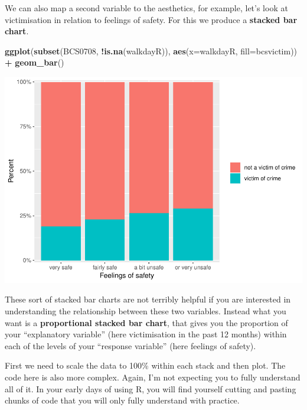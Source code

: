 \documentclass[]{book}
\newenvironment{Shaded}{\begin{snugshade}}{\end{snugshade}}
\newcommand{\DataTypeTok}[1]{\textcolor[rgb]{0.13,0.29,0.53}{#1}}
\newcommand{\KeywordTok}[1]{\textcolor[rgb]{0.13,0.29,0.53}{\textbf{#1}}}
\newcommand{\NormalTok}[1]{#1}
\newcommand{\OperatorTok}[1]{\textcolor[rgb]{0.81,0.36,0.00}{\textbf{#1}}}
\newcommand{\StringTok}[1]{\textcolor[rgb]{0.31,0.60,0.02}{#1}}
\theoremstyle{definition}
\theoremstyle{definition}
\theoremstyle{definition}
\theoremstyle{remark}
\begin{document}
We can also map a second variable to the aesthetics, for example, let's
look at victimisation in relation to feelings of safety. For this we
produce a \textbf{stacked bar chart}.

\begin{Shaded}
\begin{Highlighting}[]
\KeywordTok{ggplot}\NormalTok{(}\KeywordTok{subset}\NormalTok{(BCS0708, }\OperatorTok{!}\KeywordTok{is.na}\NormalTok{(walkdayR)), }\KeywordTok{aes}\NormalTok{(}\DataTypeTok{x=}\NormalTok{walkdayR, }\DataTypeTok{fill=}\NormalTok{bcsvictim)) }\OperatorTok{+}
\StringTok{  }\KeywordTok{geom_bar}\NormalTok{()}
\end{Highlighting}
\end{Shaded}

\includegraphics{03-visualisation_files/figure-latex/unnamed-chunk-62-1.pdf}

These sort of stacked bar charts are not terribly helpful if you are
interested in understanding the relationship between these two
variables. Instead what you want is a \textbf{proportional stacked bar
chart}, that gives you the proportion of your ``explanatory variable''
(here victimisation in the past 12 months) within each of the levels of
your ``response variable'' (here feelings of safety).

First we need to scale the data to 100\% within each stack and then
plot. The code here is also more complex. Again, I'm not expecting you
to fully understand all of it. In your early days of using R, you will
find yourself cutting and pasting chunks of code that you will only
fully understand with practice.
\end{document}
